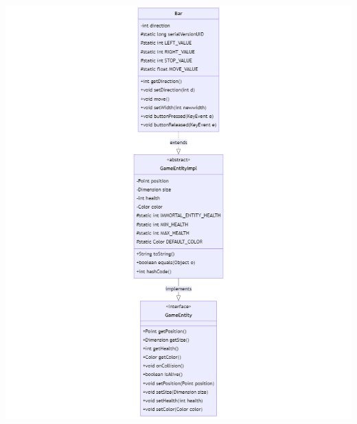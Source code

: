 \documentclass[a4paper,12pt]{report}
\begin{document}
\includegraphics[width=\textwidth]{Bar.png}\newline
\end{document}
